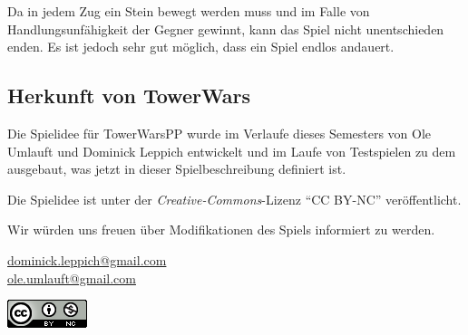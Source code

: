 Da in jedem Zug ein Stein bewegt werden muss und im Falle von Handlungsunfähigkeit der Gegner gewinnt, kann das Spiel nicht unentschieden enden. Es ist jedoch sehr gut möglich, dass ein Spiel endlos andauert.

\subsection*{Herkunft von TowerWars}
Die Spielidee für TowerWarsPP wurde im Verlaufe dieses Semesters von Ole Umlauft und Dominick Leppich entwickelt und im Laufe von Testspielen zu dem ausgebaut, was jetzt in dieser Spielbeschreibung definiert ist.

Die Spielidee ist unter der \emph{Creative-Commons}-Lizenz ``CC BY-NC'' veröffentlicht.

Wir würden uns freuen über Modifikationen des Spiels informiert zu werden.

\href{mailto:dominick.leppich@gmail.com}{dominick.leppich@gmail.com} \\
\href{mailto:ole.umlauft@gmail.com}{ole.umlauft@gmail.com}
\begin{flushright}
\includegraphics[scale=0.7]{graphic/cc.png}
\end{flushright}